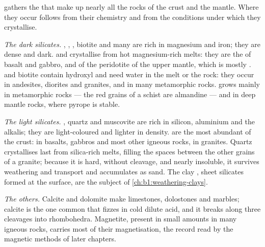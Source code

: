  gathers the  that make up
nearly all the rocks of the crust and the mantle. Where they occur follows
from their chemistry and from the conditions under which they crystallise.

\emph{The dark silicates.} , , , biotite and many
 are rich in magnesium and iron; they are dense and dark.  and
 crystallise from hot magnesium-rich melts: they are the  of
basalt and gabbro, and of the peridotite of the upper mantle, which is mostly
.  and biotite contain hydroxyl and need water in the melt
or the rock: they occur in andesites, diorites and granites, and in many
metamorphic rocks.  grows mainly in metamorphic rocks --- the red
grains of a  schist are almandine --- and in deep mantle rocks, where
pyrope is stable.

\emph{The light silicates.} , quartz and muscovite are rich in
silicon, aluminium and the alkalis; they are light-coloured and lighter in
density.  are the most abundant  of the crust:  in
basalts, gabbros and most other igneous rocks,  in granites.
Quartz crystallises last from silica-rich melts, filling the spaces between
the other grains of a granite; because it is hard, without cleavage, and
nearly insoluble, it survives weathering and transport and accumulates as
sand. The clay , sheet silicates formed at the surface, are the
subject of \cref{ch:b1:weathering-clays}.

\emph{The others.} Calcite and dolomite make limestones, dolostones and
marbles; calcite is the one common  that fizzes in cold dilute acid,
and it breaks along three cleavages into rhombohedra. Magnetite, present in small
amounts in many igneous rocks, carries most of their magnetisation, the record
read by the magnetic methods of later chapters.


